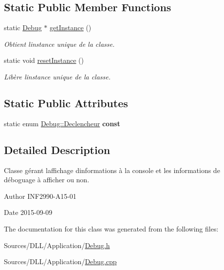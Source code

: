 \subsection*{Static Public Member Functions}
\begin{DoxyCompactItemize}
\item 
static \hyperlink{class_debug}{Debug} $\ast$ \hyperlink{group__inf2990_ga823bf701dd9f4c706143dca1e8666941}{get\+Instance} ()
\begin{DoxyCompactList}\small\item\em Obtient l\textquotesingle{}instance unique de la classe. \end{DoxyCompactList}\item 
static void \hyperlink{group__inf2990_gacaafb83305279aafab24735adc903931}{reset\+Instance} ()
\begin{DoxyCompactList}\small\item\em Libère l\textquotesingle{}instance unique de la classe. \end{DoxyCompactList}\end{DoxyCompactItemize}
\subsection*{Static Public Attributes}
\begin{DoxyCompactItemize}
\item 
\hypertarget{class_debug_a1d6c7b38caff29c900eebaef79e0adae}{}static enum \hyperlink{class_debug_afd6ed3c50c08d0a7830cd5253b4ab8b6}{Debug\+::\+Declencheur} {\bfseries const}\label{class_debug_a1d6c7b38caff29c900eebaef79e0adae}

\end{DoxyCompactItemize}


\subsection{Detailed Description}
Classe gérant l\textquotesingle{}affichage d\textquotesingle{}informations à la console et les informations de déboguage à afficher ou non. 

\begin{DoxyAuthor}{Author}
I\+N\+F2990-\/\+A15-\/01 
\end{DoxyAuthor}
\begin{DoxyDate}{Date}
2015-\/09-\/09 
\end{DoxyDate}


The documentation for this class was generated from the following files\+:\begin{DoxyCompactItemize}
\item 
Sources/\+D\+L\+L/\+Application/\hyperlink{_debug_8h}{Debug.\+h}\item 
Sources/\+D\+L\+L/\+Application/\hyperlink{_debug_8cpp}{Debug.\+cpp}\end{DoxyCompactItemize}
